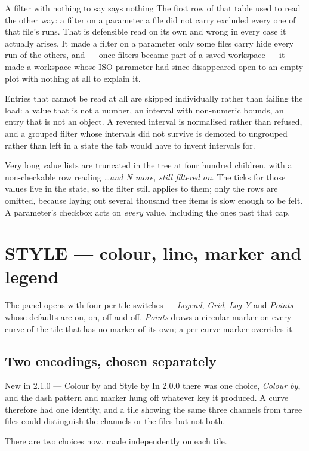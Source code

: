\documentclass[11pt,a4paper,oneside]{report}
\begin{document}
\begin{aoenote}{A filter with nothing to say says nothing}
The first row of that table used to read the other way: a filter on a parameter a
file did not carry excluded every one of that file's runs. That is defensible
read on its own and wrong in every case it actually arises. It made a filter on a
parameter only some files carry hide every run of the others, and --- once
filters became part of a saved workspace --- it made a workspace whose ISO
parameter had since disappeared open to an empty plot with nothing at all to
explain it.
\end{aoenote}

Entries that cannot be read at all are skipped individually rather than failing
the load: a value that is not a number, an interval with non-numeric bounds, an
entry that is not an object. A reversed interval is normalised rather than
refused, and a grouped filter whose intervals did not survive is demoted to
ungrouped rather than left in a state the tab would have to invent intervals for.

Very long value lists are truncated in the tree at four hundred children, with a
non-checkable row reading \emph{\ldots and N more, still filtered on}. The ticks
for those values live in the state, so the filter still applies to them; only the
rows are omitted, because laying out several thousand tree items is slow enough
to be felt. A parameter's checkbox acts on \emph{every} value, including the ones
past that cap.

\section{STYLE --- colour, line, marker and legend}
\label{sec:style}

The panel opens with four per-tile switches --- \emph{Legend}, \emph{Grid},
\emph{Log Y} and \emph{Points} --- whose defaults are on, on, off and off.
\emph{Points} draws a circular marker on every curve of the tile that has no
marker of its own; a per-curve marker overrides it.

\subsection{Two encodings, chosen separately}

\begin{aoenew}{New in 2.1.0 --- Colour by and Style by}
In 2.0.0 there was one choice, \emph{Colour by}, and the dash pattern and marker
hung off whatever key it produced. A curve therefore had one identity, and a tile
showing the same three channels from three files could distinguish the channels
or the files but not both.

There are two choices now, made independently on each tile.
\end{aoenew}
\end{document}
